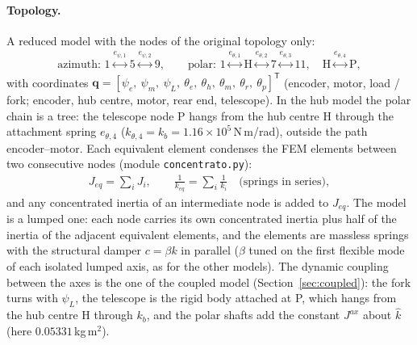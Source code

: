 \documentclass[10pt,a4paper]{article}
\numberwithin{equation}{section}
\begin{document}
\paragraph{Topology.} A reduced model with the nodes of the original topology only:
\begin{gather}
\text{azimuth: } 1 \overset{e_{\psi,1}}{\longleftrightarrow} 5 \overset{e_{\psi,2}}{\longleftrightarrow} 9, \qquad \text{polar: } 1 \overset{e_{\theta,1}}{\longleftrightarrow} \mathrm H \overset{e_{\theta,2}}{\longleftrightarrow} 7 \overset{e_{\theta,3}}{\longleftrightarrow} 11,\quad \mathrm H \overset{e_{\theta,4}}{\longleftrightarrow} \mathrm P,
\end{gather}
with coordinates $\mathbf q = [\psi_e,\ \psi_m,\ \psi_L,\ \theta_e,\ \theta_h,\ \theta_m,\ \theta_r,\ \theta_p]^{\mathsf T}$ (encoder, motor, load / fork; encoder, hub centre, motor, rear end, telescope). In the hub model the polar chain is a tree: the telescope node P hangs from the hub centre H through the attachment spring $e_{\theta,4}$ ($k_{\theta,4} = k_b = 1.16\times10^{5}$\,N\,m/rad), outside the path encoder--motor. Each equivalent element condenses the FEM elements between two consecutive nodes (module \texttt{concentrato.py}):
\begin{gather}
J_{eq} = \sum_i J_i, \qquad \frac{1}{k_{eq}} = \sum_i\frac{1}{k_i}\quad\text{(springs in series)},
\end{gather}
and any concentrated inertia of an intermediate node is added to $J_{eq}$. The model is a lumped one: each node carries its own concentrated inertia plus half of the inertia of the adjacent equivalent elements, and the elements are massless springs with the structural damper $c = \beta k$ in parallel ($\beta$ tuned on the first flexible mode of each isolated lumped axis, as for the other models). The dynamic coupling between the axes is the one of the coupled model (Section~\ref{sec:coupled}): the fork turns with $\psi_L$, the telescope is the rigid body attached at P, which hangs from the hub centre H through $k_b$, and the polar shafts add the constant $J^{ax}$ about $\hat k$ (here $0.05331$\,kg\,m$^2$).
\end{document}
